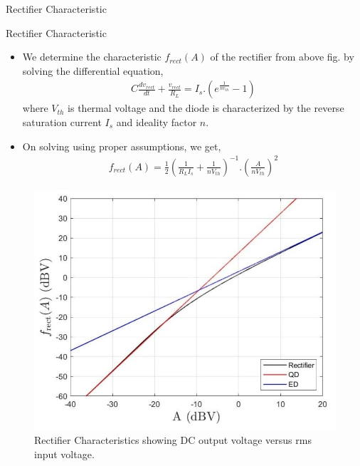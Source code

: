 \documentclass{beamer}
\begin{document}
\begin{section}{Rectifier Characteristic}
\begin{frame}{Rectifier Characteristic}
    \begin{itemize}
        \item We determine the characteristic $f_{rect}(A)$ of the rectifier from above fig. by solving the differential equation,
        \begin{align}
            C\frac{dv_{rect}}{dt}+\frac{v_{rect}}{R_L}=I_{s}.(e^{\frac{1}{nv_{th}}}-1)
        \end{align}
        where $V_{th}$ is thermal voltage and the diode is characterized by the reverse saturation current $I_{s}$ and ideality factor $n$. 
        \item On solving using proper assumptions, we get,
        \begin{align}
            f_{rect}(A)=\frac{1}{2}\left(\frac{1}{R_{L}I_{s}}+\frac{1}{nV_{th}}\right)^{-1}.\left(\frac{A}{nV_{th}}\right)^2
        \end{align}
    \end{itemize}
\end{frame}

\begin{frame}
    \begin{figure}[t]
        \centering
         \includegraphics[scale=0.3]{Images/Picture4.jpeg}
         \caption{Rectifier Characteristics showing DC output voltage versus rms input voltage.}
        \label{fig:my_label4}
        \end{figure}
\end{frame}
\end{section}
\end{document}
